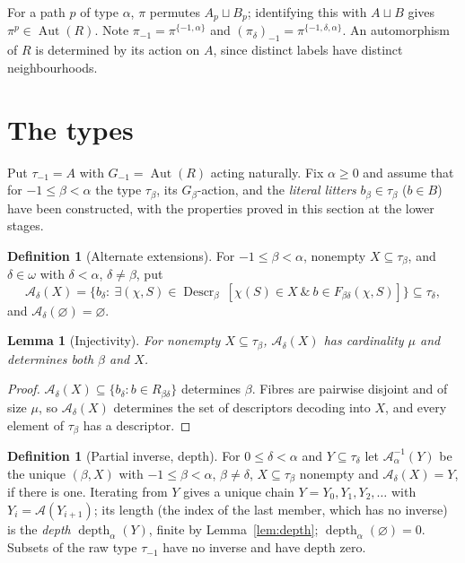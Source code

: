 \documentclass[11pt]{article}
\newtheorem{lemma}[theorem]{Lemma}
\theoremstyle{definition}
\newtheorem{definition}[theorem]{Definition}
\theoremstyle{remark}
\newcommand{\Aut}{\operatorname{Aut}}
\newcommand{\dep}{\operatorname{depth}}
\newcommand{\Descr}{\operatorname{Descr}}
\newcommand{\calA}{\mathcal A}
\begin{document}
For a path \(p\) of type \(\alpha\), \(\pi\) permutes \(A_p\sqcup B_p\);
identifying this with \(A\sqcup B\) gives \(\pi^{p}\in\Aut(R)\). Note
\(\pi_{-1}=\pi^{\{-1,\alpha\}}\) and \((\pi_\delta)_{-1}=
\pi^{\{-1,\delta,\alpha\}}\). An automorphism of \(R\) is determined by its
action on \(A\), since distinct labels have distinct neighbourhoods.

\section{The types}\label{sec:types}

Put \(\tau_{-1}=A\) with \(G_{-1}=\Aut(R)\) acting naturally. Fix
\(\alpha\geq0\) and assume that for \(-1\leq\beta<\alpha\) the type
\(\tau_\beta\), its \(G_\beta\)-action, and the \emph{literal litters}
\(b_\beta\in\tau_\beta\) (\(b\in B\)) have been constructed, with the
properties proved in this section at the lower stages.

\begin{definition}[Alternate extensions]
For \(-1\leq\beta<\alpha\), nonempty \(X\subseteq\tau_\beta\), and
\(\delta\in\omega\) with \(\delta<\alpha\), \(\delta\neq\beta\), put
\[
 \calA_\delta(X)=\{b_\delta:\ \exists(\chi,S)\in\Descr_\beta\
 [\chi(S)\in X\ \&\ b\in F_{\beta\delta}(\chi,S)]\}\subseteq\tau_\delta,
\]
and \(\calA_\delta(\varnothing)=\varnothing\).
\end{definition}

\begin{lemma}[Injectivity]\label{lem:inj}
For nonempty \(X\subseteq\tau_\beta\), \(\calA_\delta(X)\) has cardinality
\(\mu\) and determines both \(\beta\) and \(X\).
\end{lemma}
\begin{proof}
\(\calA_\delta(X)\subseteq\{b_\delta:b\in R_{\beta\delta}\}\) determines
\(\beta\). Fibres are pairwise disjoint and of size \(\mu\), so
\(\calA_\delta(X)\) determines the set of descriptors decoding into \(X\),
and every element of \(\tau_\beta\) has a descriptor.
\end{proof}

\begin{definition}[Partial inverse, depth]
For \(0\leq\delta<\alpha\) and \(Y\subseteq\tau_\delta\) let
\(\calA^{-1}_\alpha(Y)\) be the unique \((\beta,X)\) with \(-1\leq\beta<
\alpha\), \(\beta\ne\delta\), \(X\subseteq\tau_\beta\) nonempty and \(\calA_\delta(X)=Y\), if
there is one. Iterating from \(Y\) gives a unique chain
\(Y=Y_0,Y_1,Y_2,\dots\) with \(Y_i=\calA(Y_{i+1})\); its length (the index
of the last member, which has no inverse) is the \emph{depth}
\(\dep_\alpha(Y)\), finite by Lemma~\ref{lem:depth};
\(\dep_\alpha(\varnothing)=0\). Subsets of the raw type \(\tau_{-1}\) have no inverse and have depth zero.
\end{definition}
\end{document}

